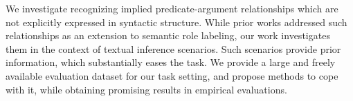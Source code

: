We investigate recognizing implied predicate-argument relationships which are not explicitly expressed in syntactic structure. While prior works addressed such relationships as an extension to semantic role labeling, our work investigates them in the context of textual inference scenarios. Such scenarios provide prior information, which substantially eases the task. We provide a large and freely available evaluation dataset for our task setting, and propose methods to cope with it, while obtaining promising results in empirical evaluations.
